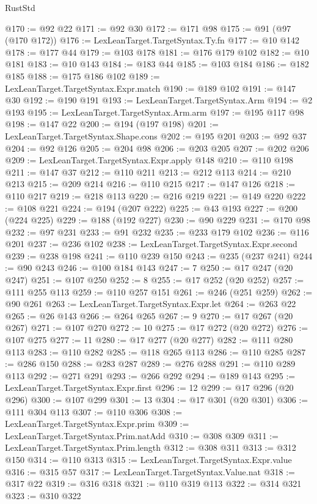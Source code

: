 \begin{lexlean}{RustStd}
\begin{coremodule}
@170 := @92 @22
@171 := @92 @30
@172 := @171 @98
@175 := @91 (@97 (@170 @172))
@176 := LexLeanTarget.TargetSyntax.Ty.fn
@177 := @10 @142
@178 := @177 @44
@179 := @103 @178
@181 := @176 @179 @102
@182 := @10 @181
@183 := @10 @143
@184 := @183 @44
@185 := @103 @184
@186 := @182 @185
@188 := @175 @186 @102
@189 := LexLeanTarget.TargetSyntax.Expr.match
@190 := @189 @102
@191 := @147 @30
@192 := @190 @191
@193 := LexLeanTarget.TargetSyntax.Arm
@194 := @2 @193
@195 := LexLeanTarget.TargetSyntax.Arm.arm
@197 := @195 @117 @98
@198 := @147 @22
@200 := @194 (@197 @198)
@201 := LexLeanTarget.TargetSyntax.Shape.cons
@202 := @195 @201
@203 := @92 @37
@204 := @92 @126
@205 := @204 @98
@206 := @203 @205
@207 := @202 @206
@209 := LexLeanTarget.TargetSyntax.Expr.apply @148
@210 := @110 @198
@211 := @147 @37
@212 := @110 @211
@213 := @212 @113
@214 := @210 @213
@215 := @209 @214
@216 := @110 @215
@217 := @147 @126
@218 := @110 @217
@219 := @218 @113
@220 := @216 @219
@221 := @149 @220
@222 := @108 @221
@224 := @194 (@207 @222)
@225 := @43 @193
@227 := @200 (@224 @225)
@229 := @188 (@192 @227)
@230 := @90 @229
@231 := @170 @98
@232 := @97 @231
@233 := @91 @232
@235 := @233 @179 @102
@236 := @116 @201
@237 := @236 @102
@238 := LexLeanTarget.TargetSyntax.Expr.second
@239 := @238 @198
@241 := @110 @239 @150
@243 := @235 (@237 @241)
@244 := @90 @243
@246 := @100 @184 @143
@247 := 7
@250 := @17 @247 (@20 @247)
@251 := @107 @250
@252 := 8
@255 := @17 @252 (@20 @252)
@257 := @111 @255 @113
@259 := @110 @257 @151
@261 := @246 (@251 @259)
@262 := @90 @261
@263 := LexLeanTarget.TargetSyntax.Expr.let
@264 := @263 @22
@265 := @26 @143
@266 := @264 @265
@267 := 9
@270 := @17 @267 (@20 @267)
@271 := @107 @270
@272 := 10
@275 := @17 @272 (@20 @272)
@276 := @107 @275
@277 := 11
@280 := @17 @277 (@20 @277)
@282 := @111 @280 @113
@283 := @110 @282
@285 := @118 @265 @113
@286 := @110 @285
@287 := @286 @150
@288 := @283 @287
@289 := @276 @288
@291 := @110 @289 @113
@292 := @271 @291
@293 := @266 @292
@294 := @189 @143
@295 := LexLeanTarget.TargetSyntax.Expr.first
@296 := 12
@299 := @17 @296 (@20 @296)
@300 := @107 @299
@301 := 13
@304 := @17 @301 (@20 @301)
@306 := @111 @304 @113
@307 := @110 @306
@308 := LexLeanTarget.TargetSyntax.Expr.prim
@309 := LexLeanTarget.TargetSyntax.Prim.natAdd
@310 := @308 @309
@311 := LexLeanTarget.TargetSyntax.Prim.length
@312 := @308 @311
@313 := @312 @150
@314 := @110 @313
@315 := LexLeanTarget.TargetSyntax.Expr.value
@316 := @315 @57
@317 := LexLeanTarget.TargetSyntax.Value.nat
@318 := @317 @22
@319 := @316 @318
@321 := @110 @319 @113
@322 := @314 @321
@323 := @310 @322

\end{coremodule}
\end{lexlean}
